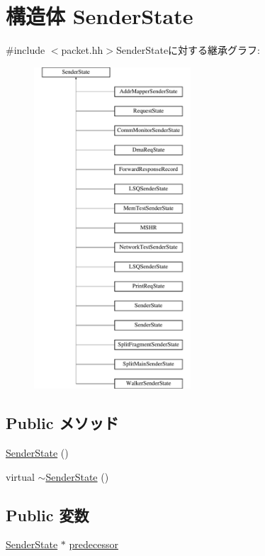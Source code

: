 \hypertarget{structPacket_1_1SenderState}{
\section{構造体 SenderState}
\label{structPacket_1_1SenderState}
}


{\ttfamily \#include $<$packet.hh$>$}SenderStateに対する継承グラフ:\begin{figure}[H]
\begin{center}
\leavevmode
\includegraphics[height=12cm]{structPacket_1_1SenderState}
\end{center}
\end{figure}
\subsection*{Public メソッド}
\begin{DoxyCompactItemize}
\item 
\hyperlink{structPacket_1_1SenderState_a72a1de46c51baff7fe6dd6f9398309ff}{SenderState} ()
\item 
virtual \hyperlink{structPacket_1_1SenderState_a20a824a492d3f182e3f8982771298cfe}{$\sim$SenderState} ()
\end{DoxyCompactItemize}
\subsection*{Public 変数}
\begin{DoxyCompactItemize}
\item 
\hyperlink{structPacket_1_1SenderState}{SenderState} $\ast$ \hyperlink{structPacket_1_1SenderState_aad46f26edbbfb9590a22fdf58ff18d84}{predecessor}
\end{DoxyCompactItemize}


